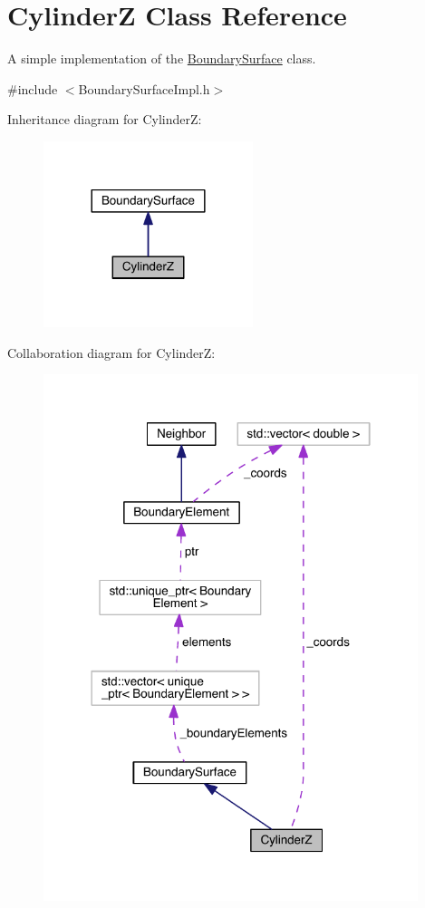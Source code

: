 \hypertarget{classCylinderZ}{\section{Cylinder\+Z Class Reference}
\label{classCylinderZ}
}


A simple implementation of the \hyperlink{classBoundarySurface}{Boundary\+Surface} class.  




{\ttfamily \#include $<$Boundary\+Surface\+Impl.\+h$>$}



Inheritance diagram for Cylinder\+Z\+:\nopagebreak
\begin{figure}[H]
\begin{center}
\leavevmode
\includegraphics[width=173pt]{classCylinderZ__inherit__graph}
\end{center}
\end{figure}


Collaboration diagram for Cylinder\+Z\+:\nopagebreak
\begin{figure}[H]
\begin{center}
\leavevmode
\includegraphics[width=310pt]{classCylinderZ__coll__graph}
\end{center}
\end{figure}
